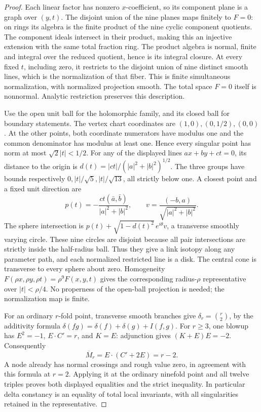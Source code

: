 \documentclass[11pt]{article}
\newcommand{\rough}{\overline M}
\begin{document}
\begin{proof}
Each linear factor has nonzero \(x\)-coefficient, so its component plane
is a graph over \((y,t)\). The disjoint union of the nine planes maps
finitely to \(F=0\): on rings its algebra is the finite product of the
nine cyclic component quotients. The component ideals intersect in their
product, making this an injective extension with the same total fraction
ring. The product algebra is normal, finite and integral over the reduced
quotient, hence is its integral closure. At every fixed \(t\), including
zero, it restricts to the disjoint union of nine distinct smooth lines,
which is the normalization of that fiber. This is finite simultaneous
normalization, with normalized projection smooth. The total space \(F=0\)
itself is nonnormal. Analytic restriction preserves this description.

Use the open unit ball for the holomorphic family, and its closed ball for
boundary statements. The vertex chart coordinates are \((1,0),(0,1/2),(0,0)\).
At the other points, both coordinate numerators have modulus one and the
common denominator has modulus at least one. Hence every singular point
has norm at most \(\sqrt2|t|<1/2\). For any of the displayed lines
\(ax+by+ct=0\), its distance to the origin is
\(d(t)=|ct|/(|a|^2+|b|^2)^{1/2}\).
The three groups have bounds respectively \(0,|t|/\sqrt5,|t|/\sqrt{13}\),
all strictly below one. A closest point and a fixed unit direction are
\[
 p(t)=-\frac{ct(\bar a,\bar b)}{|a|^2+|b|^2},\qquad
 v=\frac{(-b,a)}{\sqrt{|a|^2+|b|^2}}.
\]
The sphere intersection is
\(p(t)+\sqrt{1-d(t)^2}\,e^{i\theta}v\), a transverse smoothly varying
circle. These nine circles are disjoint because all pair intersections
are strictly inside the half-radius ball. Thus they give a link isotopy
along any parameter path, and each normalized restricted line is a disk.
The central cone is transverse to every sphere about zero. Homogeneity
\(F(\rho x,\rho y,\rho t)=\rho^9F(x,y,t)\) gives the corresponding
radius-\(\rho\) representative over \(|t|<\rho/4\). No properness of
the open-ball projection is needed; the normalization map is finite.

For an ordinary \(r\)-fold point, transverse smooth branches give
\(\delta_r=\binom r2\), by the additivity formula
\(\delta(fg)=\delta(f)+\delta(g)+I(f,g)\).
For \(r\ge3\), one blowup has \(E^2=-1\), \(E\cdot C'=r\), and
\(K=E\): adjunction gives \((K+E)E=-2\).
Consequently
\[
 \rough_r=E\cdot(C'+2E)=r-2.
\]
A node already has normal crossings and rough value zero, in agreement
with this formula at \(r=2\). Applying it at the ordinary ninefold point
and all twelve triples proves both displayed equalities and the strict
inequality. In particular delta constancy is an equality of total local
invariants, with all singularities retained in the representative.
\end{proof}
\end{document}
